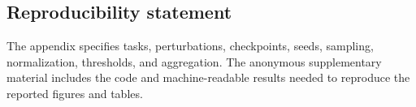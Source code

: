 \subsection*{Reproducibility statement}
The appendix specifies tasks, perturbations, checkpoints, seeds, sampling,
normalization, thresholds, and aggregation. The anonymous supplementary
material includes the code and machine-readable results needed to reproduce
the reported figures and tables.

\acpcSaveMainCounters




\ifdefined\ACPCFull
  \FloatBarrier
  \appendix
  
\fi

